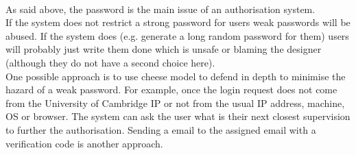 \documentclass[10pt,twoside,a4paper]{article}
\begin{document}
\begin{itemize}
\\As said above, the password is the main issue of an authorisation system.
\\If the system does not restrict a strong password for users weak passwords will be abused. If the system does (e.g. generate a long random password for them) users will probably just write them done which is unsafe or blaming the designer (although they do not have a second choice here).
\\One possible approach is to use cheese model to defend in depth to minimise the hazard of a weak password. For example, once the login request does not come from the University of Cambridge IP or not from the usual IP address, machine, OS or browser. The system can ask the user what is their next closest supervision to further the authorisation. Sending a email to the assigned email with a verification code is another approach.
\end{itemize}
\end{document}
